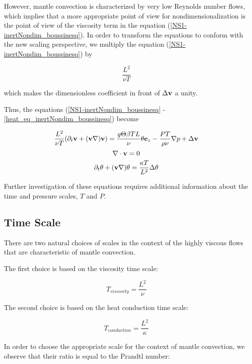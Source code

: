 However, mantle convection is characterized by very low Reynolds number flows, which implies that a more appropriate point of view for nondimensionalization is the point of view of the viscosity term in the equation (\ref{NS1-inertNondim_boussinesq}). In order to transform the equations to conform with the new scaling perspective, we multiply the equation (\ref{NS1-inertNondim_boussinesq}) by 

$$ \frac{L^2}{\nu T} $$

which makes the dimensionless coefficient in front of $\Delta\mathbf{v}$ a unity.

Thus, the equations (\ref{NS1-inertNondim_boussinesq} - \ref{heat_eq_inertNondim_boussinesq}) become

\begin{equation} \label{NS1_viscNondim_boussinesq}
\frac{L^2}{\nu T} (\partial_t\mathbf{v} + (\mathbf{v}\nabla)\mathbf{v}) = \frac{g\Theta \beta T L}{\nu} \theta \mathbf{e}_z - \frac{PT}{\rho \nu} \nabla p + \Delta\mathbf{v} 
\end{equation}
\begin{equation} \label{NS2_viscNondim_boussinesq}
\nabla\cdot \mathbf{v} = 0
\end{equation}
\begin{equation} \label{heat_eq_viscNondim_boussinesq}
\partial_t\theta + (\mathbf{v}\nabla)\theta = \frac{\kappa T}{L^2} \Delta\theta  
\end{equation} 

Further investigation of these equations requires additional information about the time and pressure scales, $T$ and $P$.

\subsection{Time Scale}

There are two natural choices of scales in the context of the highly viscous flows that are characteristic of mantle convection. \cite{getling}

The first choice is based on the viscosity time scale:

$$ T_{viscosity} = \frac{L^2}{\nu} $$

The second choice is based on the heat conduction time scale: 

$$ T_{conduction} = \frac{L^2}{\kappa} $$

In order to choose the appropriate scale for the context of mantle convection, we observe that their ratio is equal to the Prandtl number:

